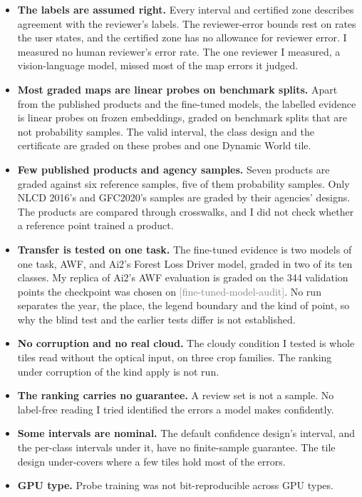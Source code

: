 \documentclass[11pt,a4paper]{article}
\newcommand{\claim}[1]{{\scriptsize\textsf{\textcolor{gray}{[#1]}}}}
\begin{document}
\begin{itemize}
\item \textbf{The labels are assumed right.} Every interval and certified zone describes agreement with the
  reviewer's labels. The reviewer-error bounds rest on rates the user states, and the certified zone has no allowance
  for reviewer error. I measured no human reviewer's error rate. The one reviewer I measured, a vision-language
  model, missed most of the map errors it judged.
\item \textbf{Most graded maps are linear probes on benchmark splits.} Apart from the published products and the
  fine-tuned models, the labelled evidence is linear probes on frozen embeddings, graded on benchmark splits that are
  not probability samples. The valid interval, the class design and the certificate are graded on these probes and
  one Dynamic World tile.
\item \textbf{Few published products and agency samples.} Seven products are graded against six reference samples,
  five of them probability samples. Only NLCD 2016's and GFC2020's samples are graded by their agencies' designs.
  The products are compared through crosswalks, and I did not check whether a reference point trained a product.
\item \textbf{Transfer is tested on one task.} The fine-tuned evidence is two models of one task, AWF, and Ai2's
  Forest Loss Driver model, graded in two of its ten classes. My replica of Ai2's AWF evaluation is graded on the 344
  validation points the checkpoint was chosen on \claim{fine-tuned-model-audit}. No run separates the year, the
  place, the legend boundary and the kind of point, so why the blind test and the earlier tests differ is not
  established.
\item \textbf{No corruption and no real cloud.} The cloudy condition I tested is whole tiles read without the
  optical input, on three crop families. The ranking under corruption of the kind \citet{lehmann2026} apply is not
  run.
\item \textbf{The ranking carries no guarantee.} A review set is not a sample. No label-free reading I tried
  identified the errors a model makes confidently.
\item \textbf{Some intervals are nominal.} The default confidence design's interval, and the per-class intervals
  under it, have no finite-sample guarantee. The tile design under-covers where a few tiles hold most of the errors.
\item \textbf{GPU type.} Probe training was not bit-reproducible across GPU types.
\end{itemize}
\end{document}
